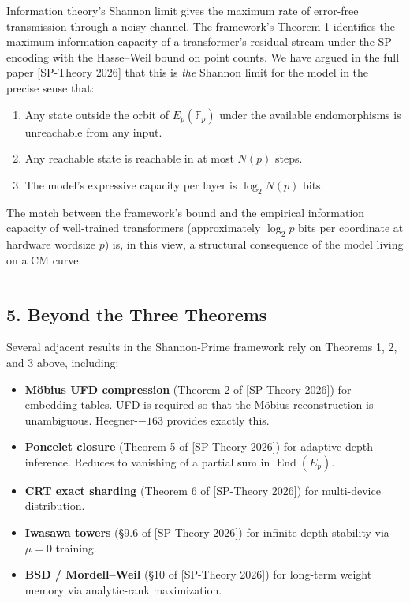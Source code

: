 \documentclass[
  11pt,
]{article}
\providecommand{\tightlist}{%
  \setlength{\itemsep}{0pt}\setlength{\parskip}{0pt}}
\begin{document}
Information theory's Shannon limit gives the maximum rate of error-free
transmission through a noisy channel. The framework's Theorem 1
identifies the maximum information capacity of a transformer's residual
stream under the SP encoding with the Hasse--Weil bound on point counts.
We have argued in the full paper {[}SP-Theory 2026{]} that this is
\emph{the} Shannon limit for the model in the precise sense that:

\begin{enumerate}
\def\labelenumi{\arabic{enumi}.}
\tightlist
\item
  Any state outside the orbit of \(E_p(\mathbb{F}_p)\) under the
  available endomorphisms is unreachable from any input.
\item
  Any reachable state is reachable in at most \(N(p)\) steps.
\item
  The model's expressive capacity per layer is \(\log_2 N(p)\) bits.
\end{enumerate}

The match between the framework's bound and the empirical information
capacity of well-trained transformers (approximately \(\log_2 p\) bits
per coordinate at hardware wordsize \(p\)) is, in this view, a
structural consequence of the model living on a CM curve.

\begin{center}\rule{0.5\linewidth}{0.5pt}\end{center}

\hypertarget{beyond-the-three-theorems}{%
\subsection{5. Beyond the Three
Theorems}\label{beyond-the-three-theorems}}

Several adjacent results in the Shannon-Prime framework rely on Theorems
1, 2, and 3 above, including:

\begin{itemize}
\tightlist
\item
  \textbf{Möbius UFD compression} (Theorem 2 of {[}SP-Theory 2026{]})
  for embedding tables. UFD is required so that the Möbius
  reconstruction is unambiguous. Heegner-\(-163\) provides exactly this.
\item
  \textbf{Poncelet closure} (Theorem 5 of {[}SP-Theory 2026{]}) for
  adaptive-depth inference. Reduces to vanishing of a partial sum in
  \(\operatorname{End}(E_p)\).
\item
  \textbf{CRT exact sharding} (Theorem 6 of {[}SP-Theory 2026{]}) for
  multi-device distribution.
\item
  \textbf{Iwasawa towers} (§9.6 of {[}SP-Theory 2026{]}) for
  infinite-depth stability via \(\mu = 0\) training.
\item
  \textbf{BSD / Mordell--Weil} (§10 of {[}SP-Theory 2026{]}) for
  long-term weight memory via analytic-rank maximization.
\end{itemize}
\end{document}
